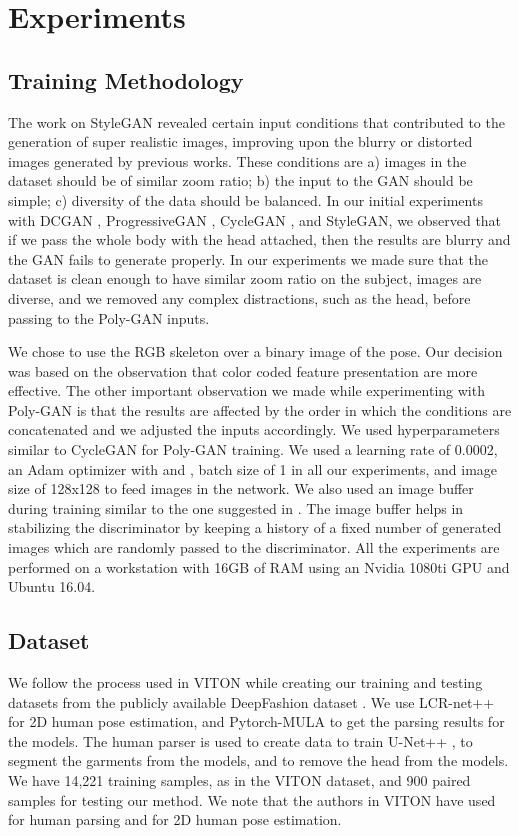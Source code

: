 \documentclass[11pt]{article}
\begin{document}
\section{Experiments}

\subsection{Training Methodology}
The work on StyleGAN \citet{StyleGAN} revealed certain input conditions that contributed to the generation of super realistic images, improving upon the blurry or distorted images generated by previous works. These conditions are a) images in the dataset should be of similar zoom ratio; b) the input to the GAN should be simple; c) diversity of the data should be balanced.
In our initial experiments with DCGAN \citet{DCGAN}, ProgressiveGAN \citet{PGAN}, CycleGAN \citet{CycleGAN}, and StyleGAN, we observed that if we pass the whole body with the head attached, then the results are blurry and the GAN fails to generate properly. In our experiments we made sure that the dataset is clean enough to have similar zoom ratio on the subject, images are diverse, and we removed any complex distractions, such as the head, before passing to the Poly-GAN inputs.


We chose to use the RGB skeleton over a binary image of the pose. Our decision was based on the observation that color coded feature presentation are more effective. The other important observation we made while experimenting with Poly-GAN is that the results are affected by the order in which the conditions are concatenated and we adjusted the inputs accordingly. We used hyperparameters similar to CycleGAN \citet{CycleGAN} for Poly-GAN training. We used a learning rate of 0.0002, an Adam optimizer with  and , batch size of 1 in all our experiments, and image size of 128x128 to feed images in the network. We also used an image buffer during training similar to the one suggested in \citet{Shrivastava}. The image buffer helps in stabilizing the discriminator by keeping a history of a fixed number of generated images which are randomly passed to the discriminator. All the experiments are performed on a workstation with 16GB of RAM using an Nvidia 1080ti GPU and Ubuntu 16.04.


\subsection{Dataset}

We follow the process used in VITON \citet{VITON} while creating our training and testing datasets from the publicly available DeepFashion dataset \citet{DeepFashion}. 
We use LCR-net++ \citet{LCR} for 2D human pose estimation, and Pytorch-MULA \citet{MULA} \citet{Pytorch-MULA} to get the parsing results for the models. The human parser \citet{MULA} is used to create data to train U-Net++ \citet{Unet++}, to segment the garments from the models, and to remove the head from the models.
We have 14,221 training samples, as in the VITON dataset, and 900 paired samples for testing our method.
We note that the authors in VITON \citet{VITON} have used \citet{SSL} for human parsing and \citet{RPose} for 2D human pose estimation. 
\end{document}
